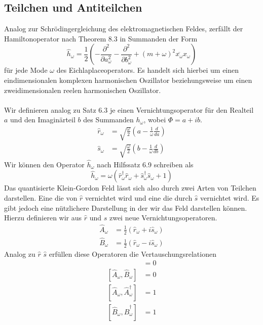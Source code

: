 \documentclass[11pt,a4paper,leqno]{report}
\numberwithin{equation}{chapter}
\begin{document}
\noindent
\subsection{Teilchen und Antiteilchen}
Analog zur Schr\"odingergleichung des elektromagnetischen Feldes, zerf\"allt der Hamiltonoperator nach Theorem 8.3 in Summanden der Form
	\begin{equation}
	\hat{h}_\omega= \frac{1}{2}(-\frac{\partial^2}{\partial a_\omega^2}-\frac{\partial^2}{\partial b_\omega^2} + (m + \omega)^2 \overline{x_\omega}x_\omega)
\end{equation}
\noindent
f\"ur jede Mode $\omega$ des Eichlaplaceoperators. Es handelt sich hierbei um einen eindimensionalen komplexen harmonischen Oszillator beziehungsweise um einen zweidimensionalen reelen harmonischen Oszillator.\\
\\
Wir definieren analog zu Satz 6.3 je einen Vernichtungsoperator f\"ur den Realteil $a$ und den Imagin\"arteil $b$ des Summanden $h_\omega$, wobei $\Phi = a +ib$.
\begin{align*}
	\hat{r}_\omega &= \sqrt{\frac{\omega}{2}}(a -\frac{1}{\omega}\frac{d}{da})\\
	\hat{s}_\omega &= \sqrt{\frac{\omega}{2}}(b -\frac{1}{\omega}\frac{d}{db})
\end{align*}
\noindent
Wir k\"onnen den Operator $\hat{h}_\omega$ nach Hilfssatz 6.9 schreiben als
\begin{equation*}
	\hat{h}_\omega = \omega(\hat{r}_\omega^\dagger\hat{r}_\omega + \hat{s}_\omega^\dagger\hat{s}_\omega + 1)
\end{equation*}
Das quantisierte Klein-Gordon Feld l\"asst sich also durch zwei Arten von Teilchen darstellen. Eine die von $\hat{r}$ vernichtet wird und eine die durch $\hat{s}$ vernichtet wird.
Es gibt jedoch eine n\"utzlichere Darstellung in der wir das Feld darstellen k\"onnen. Hierzu definieren wir aus $\hat{r}$ und $\hat{s}$ zwei neue Vernichtungsoperatoren.
\begin{align}
	\hat{A}_\omega &= \frac{1}{2}(\hat{r}_\omega + i\hat{s}_\omega)\\
	\hat{B}_\omega &= \frac{1}{2}(\hat{r}_\omega - i\hat{s}_\omega)
\end{align}
Analog zu $\hat{r}$ $\hat{s}$ erf\"ullen diese Operatoren die Vertauschungsrelationen
\begin{align*}
	[\hat{A}_\omega, \hat{B}_\omega^\dagger] &= 0\\
	[\hat{A}_\omega, \hat{B}_\omega] &= 0\\
	[\hat{A}_\omega, \hat{A}_\omega^\dagger] &= 1\\
	[\hat{B}_\omega, \hat{B}_\omega^\dagger] &= 1
\end{align*}
\end{document}
